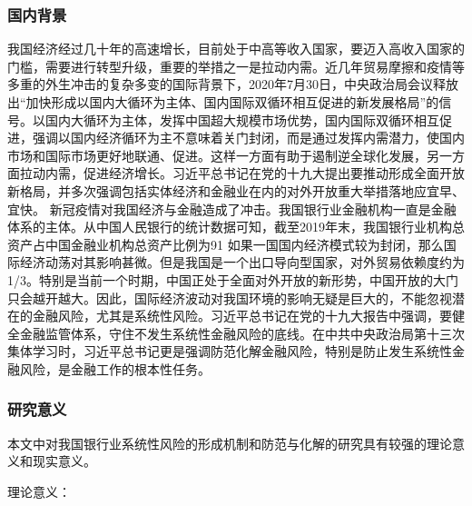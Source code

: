 \subsubsection{国内背景}
我国经济经过几十年的高速增长，目前处于中高等收入国家，要迈入高收入国家的门槛，需要进行转型升级，重要的举措之一是拉动内需。近几年贸易摩擦和疫情等多重的外生冲击的复杂多变的国际背景下，2020年7月30日，中央政治局会议释放出“加快形成以国内大循环为主体、国内国际双循环相互促进的新发展格局”的信号。以国内大循环为主体，发挥中国超大规模市场优势，国内国际双循环相互促进，强调以国内经济循环为主不意味着关门封闭，而是通过发挥内需潜力，使国内市场和国际市场更好地联通、促进。这样一方面有助于遏制逆全球化发展，另一方面拉动内需，促进经济增长。习近平总书记在党的十九大提出要推动形成全面开放新格局，并多次强调包括实体经济和金融业在内的对外开放重大举措落地应宜早、宜快。
新冠疫情对我国经济与金融造成了冲击。我国银行业金融机构一直是金融体系的主体。从中国人民银行的统计数据可知，截至2019年末，我国银行业机构总资产占中国金融业机构总资产比例为91%
如果一国国内经济模式较为封闭，那么国际经济动荡对其影响甚微。但是我国是一个出口导向型国家，对外贸易依赖度约为1/3。特别是当前一个时期，中国正处于全面对外开放的新形势，中国开放的大门只会越开越大。因此，国际经济波动对我国环境的影响无疑是巨大的，不能忽视潜在的金融风险，尤其是系统性风险。习近平总书记在党的十九大报告中强调，要健全金融监管体系，守住不发生系统性金融风险的底线。在中共中央政治局第十三次集体学习时，习近平总书记更是强调防范化解金融风险，特别是防止发生系统性金融风险，是金融工作的根本性任务。



\subsubsection{研究意义}

本文中对我国银行业系统性风险的形成机制和防范与化解的研究具有较强的理论意义和现实意义。

理论意义：

